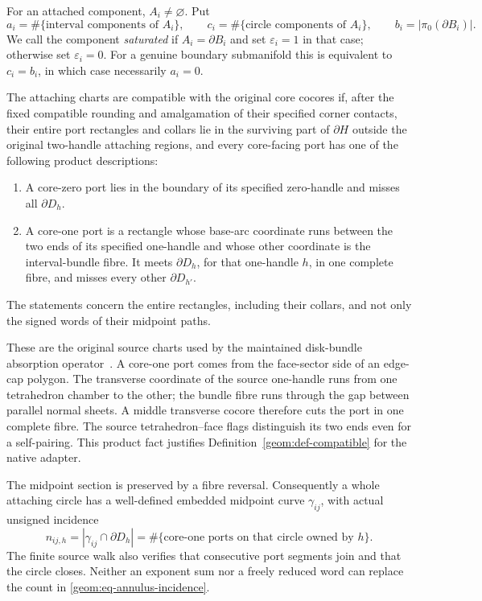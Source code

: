 For an attached component, $A_i\ne\varnothing$.  Put
\[
 a_i=\#\{\text{interval components of }A_i\},\qquad
 c_i=\#\{\text{circle components of }A_i\},\qquad
 b_i=|\pi_0(\partial B_i)|.
\]
We call the component \emph{saturated} if $A_i=\partial B_i$ and set
$\varepsilon_i=1$ in that case; otherwise set $\varepsilon_i=0$.
For a genuine boundary submanifold this is equivalent to
$c_i=b_i$, in which case necessarily $a_i=0$.

\begin{definition}
\label{geom:def-compatible}
The attaching charts are compatible with the original core cocores if,
after the fixed compatible rounding and amalgamation of their specified
corner contacts, their entire port rectangles and collars lie in the
surviving part of $\partial H$ outside the original two-handle attaching
regions, and every core-facing port has one of the following product
descriptions:
\begin{enumerate}
\item A core-zero port lies in the boundary of its specified zero-handle
and misses all $\partial D_h$.
\item A core-one port is a rectangle whose base-arc coordinate runs
between the two ends of its specified one-handle and whose other
coordinate is the interval-bundle fibre.  It meets $\partial D_h$, for
that one-handle $h$, in one complete fibre, and misses every other
$\partial D_{h'}$.
\end{enumerate}
The statements concern the entire rectangles, including their collars,
and not only the signed words of their midpoint paths.
\end{definition}

These are the original source charts used by the maintained disk-bundle
absorption operator~\cite{marked-parallelity-85}.  A core-one port comes
from the face-sector side of an edge-cap polygon.  The transverse
coordinate of the source one-handle runs from one tetrahedron chamber
to the other; the bundle fibre runs through the gap between parallel
normal sheets.  A middle transverse cocore therefore cuts the port in
one complete fibre.  The source tetrahedron--face flags distinguish its
two ends even for a self-pairing.  This product fact justifies
Definition~\ref{geom:def-compatible} for the native adapter.

The midpoint section is preserved by a fibre reversal.  Consequently a
whole attaching circle has a well-defined embedded midpoint curve
$\gamma_{ij}$, with actual unsigned incidence
\begin{equation}
 n_{ij,h}=|\gamma_{ij}\cap\partial D_h|
 =\#\{\text{core-one ports on that circle owned by }h\}.
 \label{geom:eq-annulus-incidence}
\end{equation}
The finite source walk also verifies that consecutive port segments
join and that the circle closes.  Neither an exponent sum nor a freely
reduced word can replace the count in
\eqref{geom:eq-annulus-incidence}.

